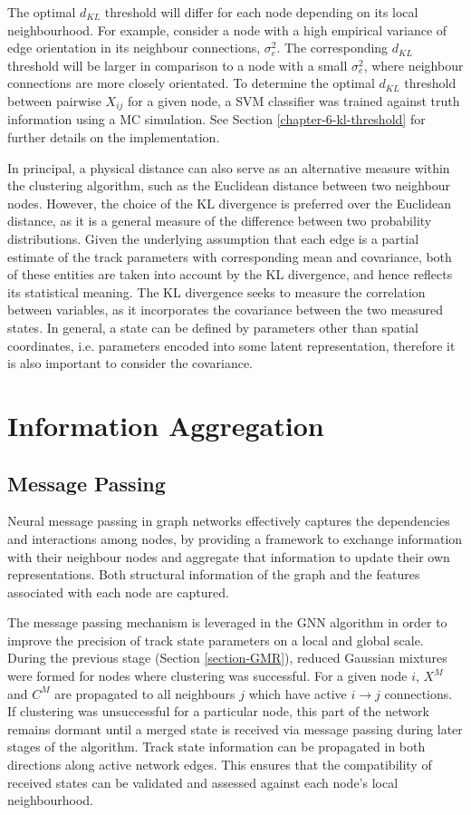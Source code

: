 The optimal $d_{KL}$ threshold will differ for each node depending on its local neighbourhood. For example, consider a node with a high empirical variance of edge orientation in its neighbour connections, $\sigma_{e}^{2}$. The corresponding $d_{KL}$ threshold will be larger in comparison to a node with a small $\sigma_{e}^{2}$, where neighbour connections are more closely orientated. To determine the optimal $d_{KL}$ threshold between pairwise $X_{ij}$ for a given node, a SVM classifier was trained against truth information using a MC simulation. See Section \ref{chapter-6-kl-threshold} for further details on the implementation.

In principal, a physical distance can also serve as an alternative measure within the clustering algorithm, such as the Euclidean distance between two neighbour nodes. However, the choice of the KL divergence is preferred over the Euclidean distance, as it is a general measure of the difference between two probability distributions. Given the underlying assumption that each edge is a partial estimate of the track parameters with corresponding mean and covariance, both of these entities are taken into account by the KL divergence, and hence reflects its statistical meaning. The KL divergence seeks to measure the correlation between variables, as it incorporates the covariance between the two measured states. In general, a state can be defined by parameters other than spatial coordinates, i.e. parameters encoded into some latent representation, therefore it is also important to consider the covariance.



\section{Information Aggregation}

\subsection{Message Passing}
Neural message passing in graph networks effectively captures the dependencies and interactions among nodes, by providing a framework to exchange information with their neighbour nodes and aggregate that information to update their own representations. Both structural information of the graph and the features associated with each node are captured.

The message passing mechanism is leveraged in the GNN algorithm in order to improve the precision of track state parameters on a local and global scale. During the previous stage (Section \ref{section-GMR}), reduced Gaussian mixtures were formed for nodes where clustering was successful. For a given node $i$, $X^M$ and $C^M$ are propagated to all neighbours $j$ which have active $i \rightarrow j$ connections. If clustering was unsuccessful for a particular node, this part of the network remains dormant until a merged state is received via message passing during later stages of the algorithm. Track state information can be propagated in both directions along active network edges. This ensures that the compatibility of received states can be validated and assessed against each node's local neighbourhood.


